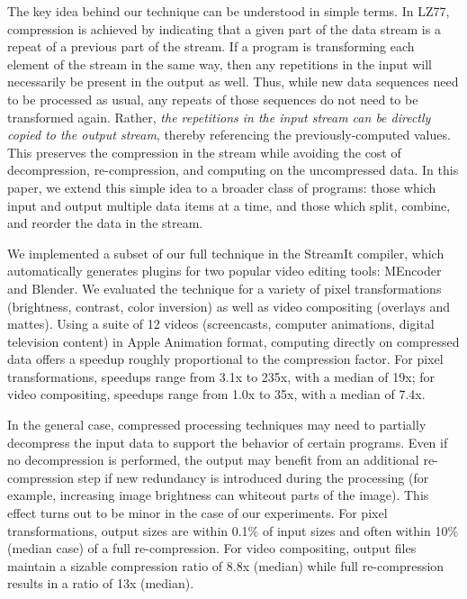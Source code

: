 The key idea behind our technique can be understood in simple terms.
In LZ77, compression is achieved by indicating that a given part of
the data stream is a repeat of a previous part of the stream.  If a
program is transforming each element of the stream in the same way,
then any repetitions in the input will necessarily be present in the
output as well.  Thus, while new data sequences need to be processed
as usual, any repeats of those sequences do not need to be transformed
again.  Rather, {\it the repetitions in the input stream can be
  directly copied to the output stream}, thereby referencing the
previously-computed values.  This preserves the compression in the
stream while avoiding the cost of decompression, re-compression, and
computing on the uncompressed data.  In this paper, we extend this
simple idea to a broader class of programs: those which input and
output multiple data items at a time, and those which split, combine,
and reorder the data in the stream.

We implemented a subset of our full technique in the StreamIt
compiler, which automatically generates plugins for two popular video
editing tools: MEncoder and Blender.  We evaluated the technique for a
variety of pixel transformations (brightness, contrast, color
inversion) as well as video compositing (overlays and mattes).  Using
a suite of 12 videos (screencasts, computer animations, digital
television content) in Apple Animation format, computing directly on
compressed data offers a speedup roughly proportional to the
compression factor.  For pixel transformations, speedups range from
3.1x to 235x, with a median of 19x; for video compositing, speedups
range from 1.0x to 35x, with a median of 7.4x.

In the general case, compressed processing techniques may need to
partially decompress the input data to support the behavior of certain
programs.  Even if no decompression is performed, the output may
benefit from an additional re-compression step if new redundancy is
introduced during the processing (for example, increasing image
brightness can whiteout parts of the image).  This effect turns out to
be minor in the case of our experiments.  For pixel transformations,
output sizes are within 0.1\% of input sizes and often within 10\%
(median case) of a full re-compression.  For video compositing, output
files maintain a sizable compression ratio of 8.8x (median) while full
re-compression results in a ratio of 13x (median).

